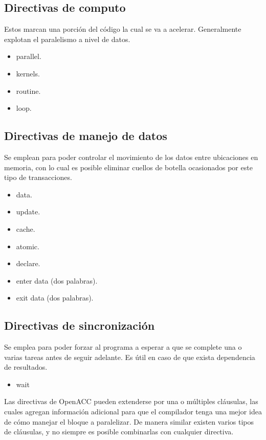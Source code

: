 \subsection*{Directivas de computo}
Estos marcan una porción del código la cual se va a acelerar. Generalmente explotan el paralelismo a nivel de datos.

\begin{itemize}
    \item parallel.
    \item kernels.
    \item routine.
    \item loop.
\end{itemize}

\subsection*{Directivas de manejo de datos}
Se emplean para poder controlar el movimiento de los datos entre ubicaciones en memoria, con lo cual es posible eliminar cuellos de botella ocasionados por este tipo de transacciones.

\begin{itemize}
    \item data.
    \item update.
    \item cache.
    \item atomic.
    \item declare.
    \item enter data (dos palabras).
    \item exit data (dos palabras).
\end{itemize}

\subsection*{Directivas de sincronización}
Se emplea para poder forzar al programa a esperar a que se complete una o varias tareas antes de seguir adelante. Es útil en caso de que exista dependencia de resultados.

\begin{itemize}
    \item wait
\end{itemize}

Las directivas de OpenACC pueden extenderse por una o múltiples cláusulas, las cuales agregan información adicional para que el compilador tenga una mejor idea de cómo manejar el bloque a paralelizar. De manera similar existen varios tipos de cláusulas, y no siempre es posible combinarlas con cualquier directiva.

